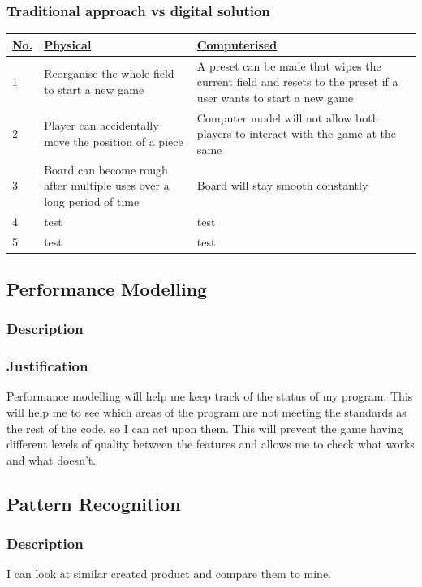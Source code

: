\documentclass[11pt,a4paper]{report}
\begin{document}
\renewcommand{\ULdepth}{1.8pt}
\subsubsection{Traditional approach vs digital solution}
\begin{center}
\begin{tabular}{ | m{1.5em} | m{15em} | m{21.2em} | }
\hline
 \uline{\textbf{No.}} & \uline{\textbf{Physical}} & \uline{\textbf{Computerised}} \\
\hline
1 & Reorganise the whole field to start a new game & A preset can be made that wipes the current field and resets to the preset if a user wants to start a new game \\
\hline
2 & Player can accidentally move the position of a piece & Computer model will not allow both players to interact with the game at the same \\
\hline
3 & Board can become rough after multiple uses over a long period of time & Board will stay smooth constantly \\
\hline
4 & test & test \\
\hline
5 & test & test \\
\hline
\end{tabular}
\end{center}

\subsection{Performance Modelling}
\subsubsection{Description}

\subsubsection{Justification}
Performance modelling will help me keep track of the status of my program. This will help me to see which areas of the program are not meeting the standards as the rest of the code, so I can act upon them. This will prevent the game having different levels of quality between the features and allows me to check what works and what doesn't.


\subsection{Pattern Recognition}
\subsubsection{Description}
I can look at similar created product and compare them to mine.
\end{document}
